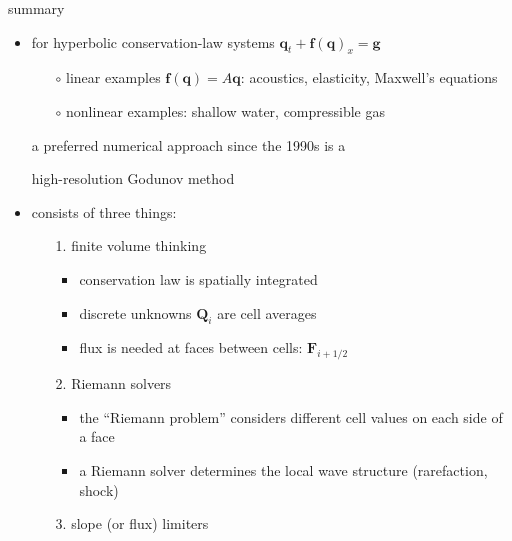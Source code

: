\documentclass[10pt,dvipsnames,usepdftitle=false,
hyperref={pdftitle = {Finite volume methods},
    pdfauthor = {Ed Bueler}}]{beamer}
\newcommand{\bbf}{\mathbf{f}}
\newcommand{\bg}{\mathbf{g}}
\newcommand{\bq}{\mathbf{q}}
\newcommand{\bF}{\mathbf{F}}
\newcommand{\bQ}{\mathbf{Q}}
\begin{document}
\begin{frame}{summary}

\begin{itemize}
\item for hyperbolic conservation-law systems $\bq_t + \bbf(\bq)_x = \bg$
    \begin{itemize}
    \item[$\circ$] linear examples $\bbf(\bq)=A\bq$: acoustics, elasticity, Maxwell's equations
    \item[$\circ$] nonlinear examples: shallow water, compressible gas
    \end{itemize}
a preferred numerical approach since the 1990s is a
\begin{center}
\alert{high-resolution Godunov method}
\end{center}
\item consists of three things:
    \begin{itemize}
    \item[\alert{1.}] \alert{finite volume thinking}
        \begin{itemize}
        \item conservation law is spatially integrated
        \item discrete unknowns $\bQ_i$ are cell averages
        \item flux is needed at faces between cells: $\bF_{i+1/2}$
        \end{itemize}
    \item[\alert{2.}] \alert{Riemann solvers}
        \begin{itemize}
        \item the ``Riemann problem'' considers different cell values on each side of a face
        \item a Riemann solver determines the local wave structure (rarefaction, shock)
        \end{itemize}
    \item[\alert{3.}] \alert{slope (or flux) limiters}
        \begin{itemize}

\end{itemize}
\end{itemize}
\end{itemize}
\end{frame}
\end{document}
